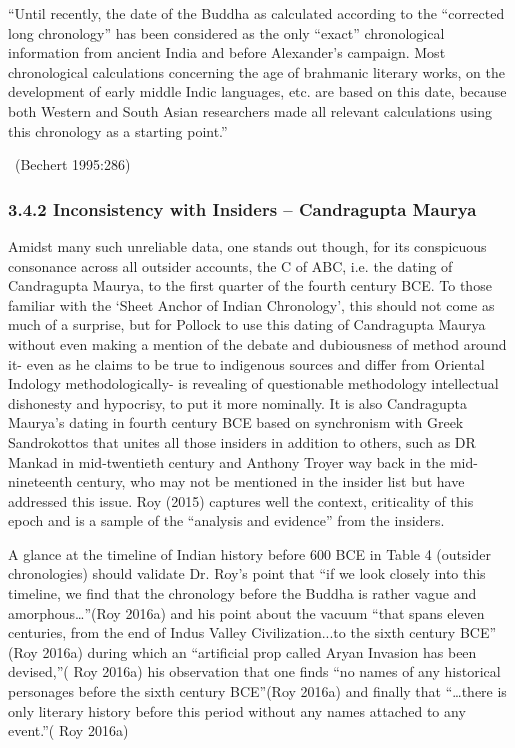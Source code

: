 \begin{myquote}
“Until recently, the date of the Buddha as calculated according to the “corrected long chronology” has been considered as the only “exact” chronological information from ancient India and before Alexander’s campaign. Most chronological calculations concerning the age of brahmanic literary works, on the development of early middle Indic languages, etc. are based on this date, because both Western and South Asian researchers made all relevant calculations using this chronology as a starting point.” 

~\hfill (Bechert 1995:286)
\end{myquote}


\subsubsection*{3.4.2 Inconsistency with Insiders – Candragupta Maurya}

Amidst many such unreliable data, one stands out though, for its conspicuous consonance across all outsider accounts, the C of ABC, i.e. the dating of Candragupta Maurya, to the first quarter of the fourth century BCE. To those familiar with the ‘Sheet Anchor of Indian Chronology’, this should not come as much of a surprise, but for Pollock to use this dating of Candragupta Maurya without even making a mention of the debate and dubiousness of method around it- even as he claims to be true to indigenous sources and differ from Oriental Indology methodologically- is revealing of questionable methodology intellectual dishonesty and hypocrisy, to put it more nominally. It is also Candragupta Maurya’s dating in fourth century BCE based on synchronism with Greek Sandrokottos that unites all those insiders in addition to others, such as DR Mankad in mid-twentieth century and Anthony Troyer way back in the mid-nineteenth century, who may not be mentioned in the insider list but have addressed this issue. Roy (2015) captures well the context, criticality of this epoch and is a sample of the “analysis and evidence” from the insiders.

A glance at the timeline of Indian history before 600 BCE in Table 4 (outsider chronologies) should validate Dr. Roy’s point that “if we look closely into this timeline, we find that the chronology before the Buddha is rather vague and amorphous…”(Roy 2016a) and his point about the vacuum “that spans eleven centuries, from the end of Indus Valley Civilization...to the sixth century BCE” (Roy 2016a) during which an “artificial prop called Aryan Invasion has been devised,”( Roy 2016a) his observation that one finds “no names of any historical personages before the sixth century BCE”(Roy 2016a) and finally that “…there is only literary history before this period without any names attached to any event.”( Roy 2016a)

